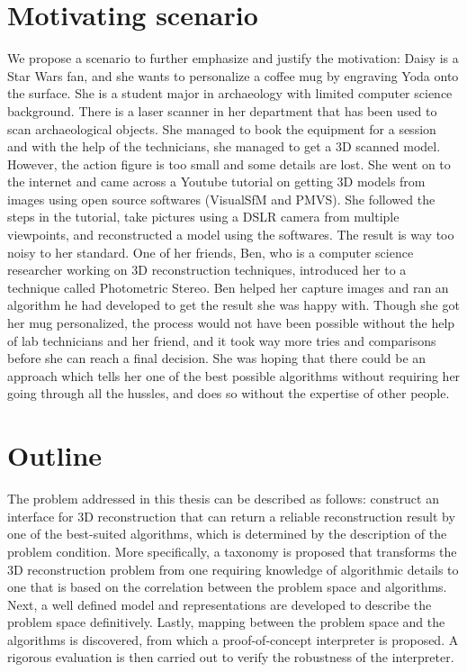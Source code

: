 \section{Motivating scenario}
We propose a scenario to further emphasize and justify the motivation: Daisy is a Star Wars fan, and she wants to personalize a coffee mug by engraving Yoda onto the surface. She is a student major in archaeology with limited computer science background. There is a laser scanner in her department that has been used to scan archaeological objects. She managed to book the equipment for a session and with the help of the technicians, she managed to get a 3D scanned model. However, the action figure is too small and some details are lost. She went on to the internet and came across a Youtube tutorial on getting 3D models from images using open source softwares (VisualSfM and PMVS). She followed the steps in the tutorial, take pictures using a DSLR camera from multiple viewpoints, and reconstructed a model using the softwares. The result is way too noisy to her standard. One of her friends, Ben, who is a computer science researcher working on 3D reconstruction techniques, introduced her to a technique called Photometric Stereo. Ben helped her capture images and ran an algorithm he had developed to get the result she was happy with. Though she got her mug personalized, the process would not have been possible without the help of lab technicians and her friend, and it took way more tries and comparisons before she can reach a final decision. She was hoping that there could be an approach which tells her one of the best possible algorithms without requiring her going through all the hussles, and does so without the expertise of other people.

\section{Outline}
The problem addressed in this thesis can be described as follows: construct an interface for 3D reconstruction that can return a reliable reconstruction result by one of the best-suited algorithms, which is determined by the description of the problem condition. More specifically, a taxonomy is proposed that transforms the 3D reconstruction problem from one requiring knowledge of algorithmic details to one that is based on the correlation between the problem space and algorithms. Next, a well defined model and representations are developed to describe the problem space definitively. Lastly, mapping between the problem space and the algorithms is discovered, from which a proof-of-concept interpreter is proposed. A rigorous evaluation is then carried out to verify the robustness of the interpreter. 

